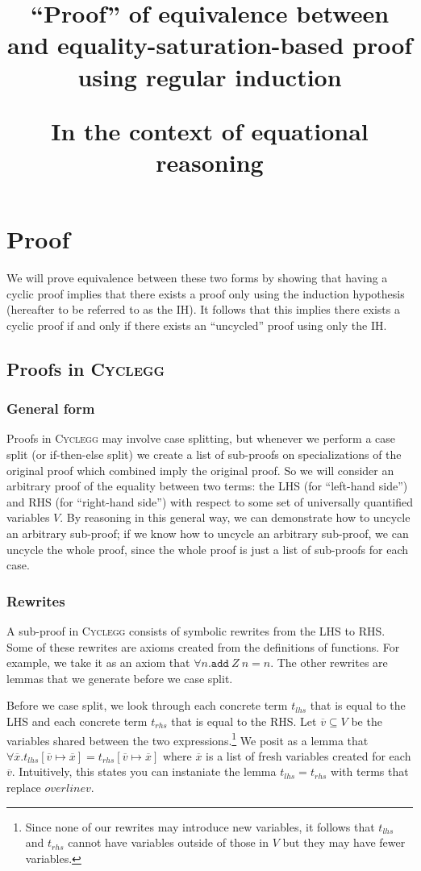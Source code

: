 \documentclass{article}[11pt]
\title{``Proof'' of equivalence between \cyclegg{} and equality-saturation-based proof using regular induction \\
  \begin{large} In the context of equational reasoning \end{large}}
\newcommand{\cyclegg}{\textsc{Cyclegg}}
\newcommand{\add}[2]{\texttt{add}\ #1 \ #2}
\begin{document}
\maketitle{}

\section{Proof}

We will prove equivalence between these two forms by showing that having a
cyclic proof implies that there exists a proof only using the induction
hypothesis (hereafter to be referred to as the IH). It follows that this implies
there exists a cyclic proof if and only if there exists an ``uncycled'' proof
using only the IH.

\subsection{Proofs in \cyclegg{}}

\subsubsection{General form}

Proofs in \cyclegg{} may involve case splitting, but whenever we perform a case
split (or if-then-else split) we create a list of sub-proofs on specializations
of the original proof which combined imply the original proof. So we will
consider an arbitrary proof of the equality between two terms: the LHS (for
``left-hand side'') and RHS (for ``right-hand side'') with respect to some set
of universally quantified variables \(V\). By reasoning in this general way, we
can demonstrate how to uncycle an arbitrary sub-proof; if we know how to uncycle
an arbitrary sub-proof, we can uncycle the whole proof, since the whole proof is
just a list of sub-proofs for each case.

\subsubsection{Rewrites}

A sub-proof in \cyclegg{} consists of symbolic rewrites from the LHS to RHS.
Some of these rewrites are axioms created from the definitions of functions. For
example, we take it as an axiom that \(\forall n. \add Z n = n\). The other
rewrites are lemmas that we generate before we case split.

Before we case split, we look through each concrete term \(t_{lhs}\) that is
equal to the LHS and each concrete term \(t_{rhs}\) that is equal to the RHS.
Let \(\overline{v} \subseteq V\) be the variables shared between the two
expressions.\footnote{Since none of our rewrites may introduce new variables, it
  follows that \(t_{lhs}\) and \(t_{rhs}\) cannot have variables outside of
  those in \(V\) but they may have fewer variables.} We posit as a lemma that
\(\forall \overline{x}. t_{lhs}[\overline{v} \mapsto \overline{x}] = t_{rhs}[\overline{v} \mapsto \overline{x}]\)
where \(\overline{x}\) is a list of fresh variables created for each
\(\overline{v}\). Intuitively, this states you can instaniate the lemma
\(t_{lhs} = t_{rhs}\) with terms that replace \(overline{v}\).
\end{document}
